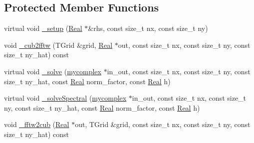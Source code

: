 \subsection*{Protected Member Functions}
\begin{DoxyCompactItemize}
\item 
virtual void \hyperlink{class_poisson_solver_scalar_f_f_t_w_a0e20043e8672d540cf4cc859d12e20ff}{\+\_\+setup} (\hyperlink{_h_d_f5_dumper_8h_a445a5f0e2a34c9d97d69a3c2d1957907}{Real} $\ast$\&rhs, const size\+\_\+t nx, const size\+\_\+t ny)
\item 
void \hyperlink{class_poisson_solver_scalar_f_f_t_w_af5a5560916d9fbc9a015709b54dbe3cd}{\+\_\+cub2fftw} (T\+Grid \&grid, \hyperlink{_h_d_f5_dumper_8h_a445a5f0e2a34c9d97d69a3c2d1957907}{Real} $\ast$out, const size\+\_\+t nx, const size\+\_\+t ny, const size\+\_\+t ny\+\_\+hat) const 
\item 
virtual void \hyperlink{class_poisson_solver_scalar_f_f_t_w_a8e651a6e6e1f0bbf6360afb933d4fac1}{\+\_\+solve} (\hyperlink{_poisson_solver_scalar_f_f_t_w_8h_af35d52b40fd37a740c7a93765c33e7e5}{mycomplex} $\ast$in\+\_\+out, const size\+\_\+t nx, const size\+\_\+t ny, const size\+\_\+t ny\+\_\+hat, const \hyperlink{_h_d_f5_dumper_8h_a445a5f0e2a34c9d97d69a3c2d1957907}{Real} norm\+\_\+factor, const \hyperlink{_h_d_f5_dumper_8h_a445a5f0e2a34c9d97d69a3c2d1957907}{Real} h)
\item 
virtual void \hyperlink{class_poisson_solver_scalar_f_f_t_w_ac9b65eddfae730b7b8ca9d31d96f8d5b}{\+\_\+solve\+Spectral} (\hyperlink{_poisson_solver_scalar_f_f_t_w_8h_af35d52b40fd37a740c7a93765c33e7e5}{mycomplex} $\ast$in\+\_\+out, const size\+\_\+t nx, const size\+\_\+t ny, const size\+\_\+t ny\+\_\+hat, const \hyperlink{_h_d_f5_dumper_8h_a445a5f0e2a34c9d97d69a3c2d1957907}{Real} norm\+\_\+factor, const \hyperlink{_h_d_f5_dumper_8h_a445a5f0e2a34c9d97d69a3c2d1957907}{Real} h)
\item 
void \hyperlink{class_poisson_solver_scalar_f_f_t_w_a07bdeb54b169896f3eb02ada52a2213c}{\+\_\+fftw2cub} (\hyperlink{_h_d_f5_dumper_8h_a445a5f0e2a34c9d97d69a3c2d1957907}{Real} $\ast$out, T\+Grid \&grid, const size\+\_\+t nx, const size\+\_\+t ny, const size\+\_\+t ny\+\_\+hat) const 
\end{DoxyCompactItemize}
